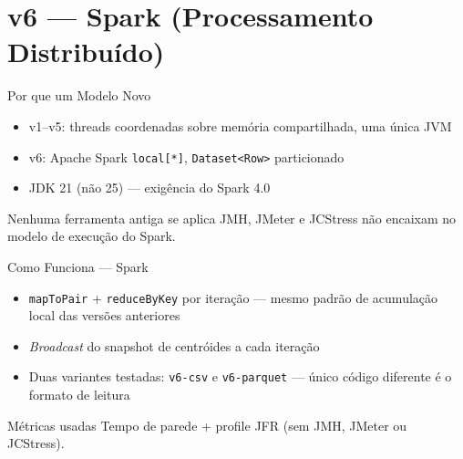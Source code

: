 \section{v6 --- Spark (Processamento Distribuído)}

\begin{frame}{Por que um Modelo Novo}
    \begin{itemize}
        \item v1--v5: threads coordenadas sobre memória compartilhada, uma
              única JVM
        \item v6: Apache Spark \texttt{local[*]}, \texttt{Dataset<Row>}
              particionado
        \item JDK 21 (não 25) --- exigência do Spark 4.0
    \end{itemize}

    \vspace{0.8em}
    \begin{alertblock}{Nenhuma ferramenta antiga se aplica}
        JMH, JMeter e JCStress não encaixam no modelo de execução do Spark.
    \end{alertblock}
\end{frame}

\begin{frame}{Como Funciona --- Spark}
    \begin{itemize}
        \item \texttt{mapToPair} + \texttt{reduceByKey} por iteração --- mesmo
              padrão de acumulação local das versões anteriores
        \item \textit{Broadcast} do snapshot de centróides a cada iteração
        \item Duas variantes testadas: \texttt{v6-csv} e \texttt{v6-parquet}
              --- único código diferente é o formato de leitura
    \end{itemize}

    \vspace{0.8em}
    \begin{block}{Métricas usadas}
        Tempo de parede + profile JFR (sem JMH, JMeter ou JCStress).
    \end{block}
\end{frame}

